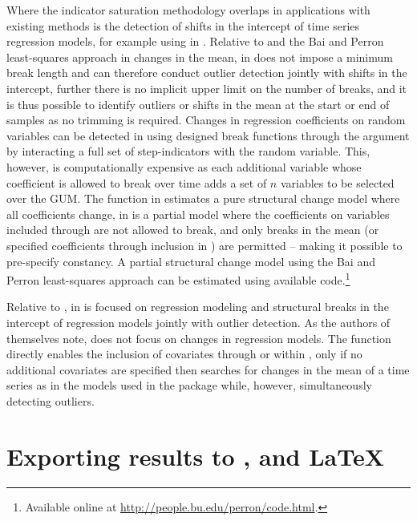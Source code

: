 \documentclass[article,nojss]{jss}
\begin{document}
Where the indicator saturation methodology overlaps in applications
with existing methods is the detection of shifts in the intercept of
time series regression models, for example using  in
. Relative to  and the Bai and
Perron least-squares approach in changes in the mean,  in
 does not impose a minimum break length and can therefore
conduct outlier detection jointly with shifts in the intercept,
further there is no implicit upper limit on the number of breaks, and
it is thus possible to identify outliers or shifts in the mean at the
start or end of samples as no trimming is required. Changes in
regression coefficients on random variables can be detected in
 using designed break functions through the 
argument by interacting a full set of step-indicators with the random
variable. This, however, is computationally expensive as each
additional variable whose coefficient is allowed to break over time
adds a set of $n$ variables to be selected over the GUM. The function
 in  estimates a pure structural
change model where all coefficients change,  in 
is a partial model where the coefficients on variables included
through  are not allowed to break, and only breaks in the
mean (or specified coefficients through inclusion in ) are
permitted -- making it possible to pre-specify constancy. A partial
structural change model using the Bai and Perron least-squares
approach can be estimated using available 
code.\footnote{Available online at
  \url{http://people.bu.edu/perron/code.html}.}

Relative to ,  in  is focused on
regression modeling and structural breaks in the intercept of
regression models jointly with outlier detection. As the authors of
 themselves note,  does not focus on
changes in regression models. The function  directly
enables the inclusion of covariates through  or 
within , only if no additional covariates are specified
then  searches for changes in the mean of a time series as
in the models used in the  package while, however,
simultaneously detecting outliers.
	
\section[Exporting results to EViews, STATA, and LaTeX]{Exporting results to ,  and \LaTeX{}}
\label{sec:eviews:and:stata:export}
	
\end{document}

